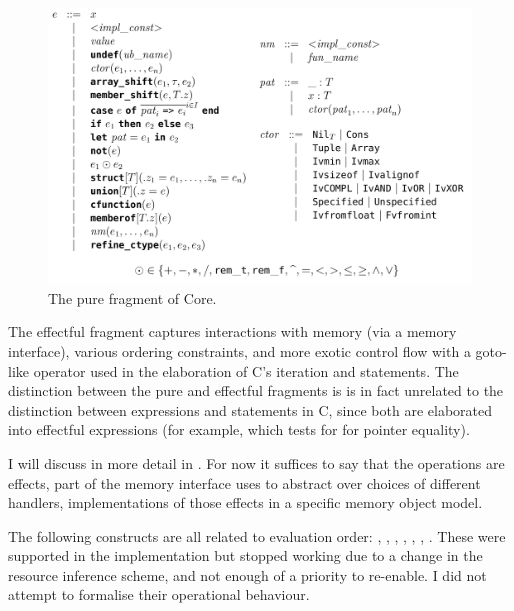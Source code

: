 \begin{figure}[tp]
    \ContinuedFloat*
    \includegraphics{figures/pure-core.png}
    \caption{The pure fragment of Core.}\label{fig:pure-core-grammar}
\end{figure}

The effectful fragment captures interactions with memory (via a memory
interface), various ordering constraints, and more exotic control flow with a
goto-like operator used in the elaboration of C's iteration and 
statements. The distinction between the pure and effectful fragments is is in
fact unrelated to the distinction between expressions and statements in C,
since both are elaborated into effectful expressions (for example,
 which tests for for pointer equality).

I will discuss  in more detail in %
. For now it suffices to say that the
operations are effects, part of the memory interface  uses to abstract
over choices of different handlers, implementations of those effects in a
specific memory object model.

The following constructs are all related to evaluation order:
, , , %
, , , %
. These were supported in the implementation but  %
stopped working due to a change in the resource inference scheme, and not
enough of a priority to re-enable. I did not attempt to formalise their
operational behaviour.

